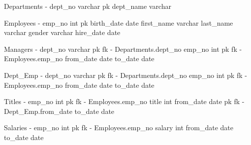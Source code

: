 Departments
-
dept_no varchar pk
dept_name varchar

Employees
-
emp_no int pk
birth_date date
first_name varchar
last_name varchar
gender varchar
hire_date date

Managers
-
dept_no varchar pk fk - Departments.dept_no
emp_no int pk fk - Employees.emp_no
from_date date
to_date date

Dept_Emp
-
dept_no varchar pk fk - Departments.dept_no
emp_no int pk fk - Employees.emp_no
from_date date 
to_date date

Titles
-
emp_no int pk fk - Employees.emp_no
title int
from_date date pk fk - Dept_Emp.from_date
to_date date

Salaries
-
emp_no int pk fk - Employees.emp_no
salary int
from_date date
to_date date

